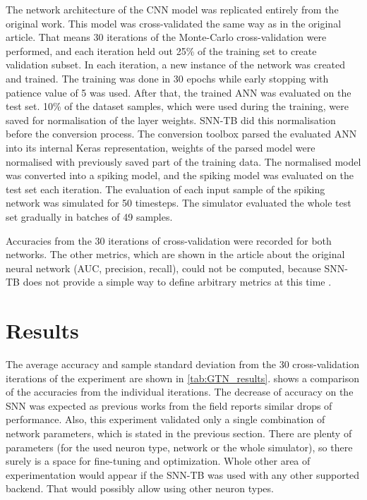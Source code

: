 The network architecture of the CNN model was replicated entirely from the original work. This model was cross-validated the same way as in the original article. That means 30 iterations of the Monte-Carlo cross-validation were performed, and each iteration held out 25\% of the training set to create validation subset. In each iteration, a new instance of the network was created and trained. The training was done in 30 epochs while early stopping with patience value of 5 was used. After that, the trained ANN was evaluated on the test set. 10\% of the dataset samples, which were used during the training, were saved for normalisation of the layer weights. SNN-TB did this normalisation before the conversion process. The conversion toolbox parsed the evaluated ANN into its internal Keras representation, weights of the parsed model were normalised with previously saved part of the training data. The normalised model was converted into a spiking model, and the spiking model was evaluated on the test set each iteration. The evaluation of each input sample of the spiking network was simulated for 50 timesteps. The simulator evaluated the whole test set gradually in batches of 49 samples. \par
Accuracies from the 30 iterations of cross-validation were recorded for both networks. The other metrics, which are shown in the article about the original neural network (AUC, precision, recall), could not be computed, because SNN-TB does not provide a simple way to define arbitrary metrics at this time \footnotemark.


\section{Results}
The average accuracy and sample standard deviation from the 30 cross-validation iterations of the experiment are shown in \cref{tab:GTN_results}.  shows a comparison of the accuracies from the individual iterations. The decrease of accuracy on the SNN was expected as previous works from the field reports similar drops of performance. Also, this experiment validated only a single combination of network parameters, which is stated in the previous section. There are plenty of parameters (for the used neuron type, network or the whole simulator), so there surely is a space for fine-tuning and optimization. Whole other area of experimentation would appear if the SNN-TB was used with any other supported backend. That would possibly allow using other neuron types.

